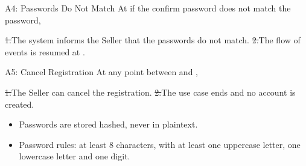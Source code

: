 \begin{flowblock}{A4: Passwords Do Not Match}
At  if the confirm password does not match the password,\par
\st{1.}{The system informs the Seller that the passwords do not match.}
\st{2.}{The flow of events is resumed at .}
\end{flowblock}
\begin{flowblock}{A5: Cancel Registration}
At any point between  and ,\par
\st{1.}{The Seller can cancel the registration.}
\st{2.}{The use case ends and no account is created.}
\end{flowblock}
\begin{itemize}
  \item Passwords are stored hashed, never in plaintext.
  \item Password rules: at least 8 characters, with at least one uppercase letter, one lowercase letter and one digit.
\end{itemize}

